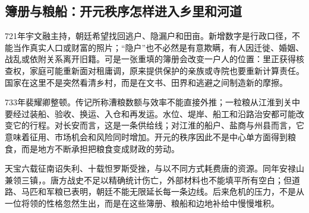 \subsection{簿册与粮船：开元秩序怎样进入乡里和河道}
721年宇文融主持，朝廷希望找回逃户、隐漏户和田亩。新增数字是行政口径，不能当作真实人口或财富的照片；“隐户”也不必然是有意欺瞒，有人因迁徙、婚姻、战乱或依附关系离开旧籍。可是一张重填的簿册会改变一户人的位置：里正获得核查权，家庭可能重新面对租庸调，原来提供保护的亲族或寺院也要重新计算责任。国家在这里不是突然看清乡村，而是在文书、田界和逃避之间制造新的摩擦。

733年裴耀卿整顿。传记所称漕粮数额与效率不能直接外推；一粒粮从江淮到关中要经过装船、验收、换运、入仓和再发运。水位、堤岸、船工和沿路治安都可能改变它的行程。对长安而言，这是一条供给线；对江淮的船户、盐商与州县而言，它意味着征用、市场机会和风险同时增加。开元的秩序因此不是中心单方面得到粮食，而是地方不断承担把粮食变成财政的劳动。

天宝六载征南诏失利、十载怛罗斯受挫，与以不同方式耗费唐的资源。同年安禄山兼领三镇，。唐方战史不足以精确统计伤亡，外部材料也不能填平所有空白；但道路、马匹和军粮已表明，朝廷不能无限延长每一条边线。后来危机的压力，不是从一位将领的性格忽然生出，而是在这些簿册、粮船和边地补给中慢慢堆积。
